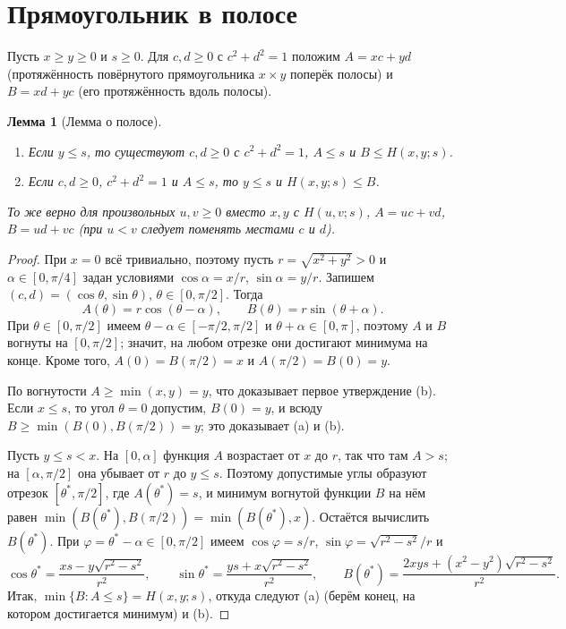 \documentclass[11pt]{article}
\newtheorem{lemma}[theorem]{Лемма}
\theoremstyle{definition}
\theoremstyle{remark}
\begin{document}
\section{Прямоугольник в полосе}\label{sec:strip}

Пусть $x\ge y\ge 0$ и $s\ge0$. Для $c,d\ge0$ с $c^2+d^2=1$ положим $A=xc+yd$ (протяжённость
повёрнутого прямоугольника $x\times y$ поперёк полосы) и $B=xd+yc$ (его протяжённость вдоль полосы).

\begin{lemma}[Лемма о полосе]\label{lem:strip}
\begin{enumerate}
\item[(a)] Если $y\le s$, то существуют $c,d\ge 0$ с $c^2+d^2=1$, $A\le s$ и $B\le H(x,y;s)$.
\item[(b)] Если $c,d\ge0$, $c^2+d^2=1$ и $A\le s$, то $y\le s$ и $H(x,y;s)\le B$.
\end{enumerate}
То же верно для произвольных $u,v\ge0$ вместо $x,y$ с $H(u,v;s)$, $A=uc+vd$, $B=ud+vc$ (при $u<v$
следует поменять местами $c$ и $d$).
\end{lemma}

\begin{proof}
При $x=0$ всё тривиально, поэтому пусть $r=\sqrt{x^2+y^2}>0$ и $\alpha\in[0,\pi/4]$ задан условиями
$\cos\alpha=x/r$, $\sin\alpha=y/r$. Запишем $(c,d)=(\cos\theta,\sin\theta)$, $\theta\in[0,\pi/2]$.
Тогда
\[
A(\theta)=r\cos(\theta-\alpha),\qquad B(\theta)=r\sin(\theta+\alpha).
\]
При $\theta\in[0,\pi/2]$ имеем $\theta-\alpha\in[-\pi/2,\pi/2]$ и $\theta+\alpha\in[0,\pi]$, поэтому
$A$ и $B$ вогнуты на $[0,\pi/2]$; значит, на любом отрезке они достигают минимума на конце. Кроме того,
$A(0)=B(\pi/2)=x$ и $A(\pi/2)=B(0)=y$.

По вогнутости $A\ge\min(x,y)=y$, что доказывает первое утверждение (b). Если $x\le s$, то угол
$\theta=0$ допустим, $B(0)=y$, и всюду $B\ge\min(B(0),B(\pi/2))=y$; это доказывает (a) и (b).

Пусть $y\le s<x$. На $[0,\alpha]$ функция $A$ возрастает от $x$ до $r$, так что там $A>s$; на
$[\alpha,\pi/2]$ она убывает от $r$ до $y\le s$. Поэтому допустимые углы образуют отрезок
$[\theta^*,\pi/2]$, где $A(\theta^*)=s$, и минимум вогнутой функции $B$ на нём равен
$\min(B(\theta^*),B(\pi/2))=\min(B(\theta^*),x)$. Остаётся вычислить $B(\theta^*)$. При
$\varphi=\theta^*-\alpha\in[0,\pi/2]$ имеем $\cos\varphi=s/r$, $\sin\varphi=\sqrt{r^2-s^2}/r$ и
\[
\cos\theta^*=\frac{xs-y\sqrt{r^2-s^2}}{r^2},\qquad
\sin\theta^*=\frac{ys+x\sqrt{r^2-s^2}}{r^2},\qquad
B(\theta^*)=\frac{2xys+(x^2-y^2)\sqrt{r^2-s^2}}{r^2}.
\]
Итак, $\min\{B:A\le s\}=H(x,y;s)$, откуда следуют (a) (берём конец, на котором достигается минимум)
и (b).
\end{proof}
\end{document}
